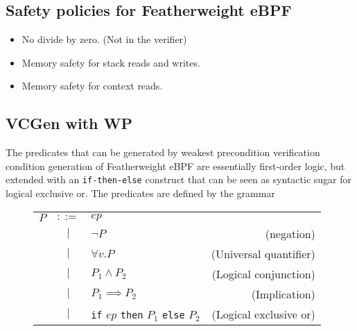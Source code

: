\subsection{Safety policies for Featherweight eBPF}
\label{subsec:safety_policies_for_featherweight_ebpf}


\begin{itemize}
\item No divide by zero. (Not in the verifier)
\item Memory safety for stack reads and writes.
\item Memory safety for context reads.

\end{itemize}


\subsection{VCGen with WP}
\label{subsec:vcgen_wp}

The predicates that can be generated by weakest precondition verification condition generation of Featherweight eBPF are essentially first-order logic, but extended with an \texttt{if-then-else} construct that can be seen as syntactic sugar for logical exclusive or. The predicates are defined by the grammar
\begin{figure}[H]
  \centering
  \begin{tabular}{lclr}
    $P$ & $::=$ & $ep$ & \\
                 & $|$ & $\neg P$ & (negation) \\    
                 & $|$ & $\forall v . P$ & (Universal quantifier) \\
                 & $|$ &  $P_1 \land P_2$ & (Logical conjunction) \\
                 & $|$ &  $P_1 \implies P_2$ & (Implication) \\
                 & $|$ &  \texttt{if} $ep$ \texttt{then} $P_1$ \texttt{else}  $P_2$ & (Logical exclusive or) \\        
\end{tabular}    
\end{figure}



